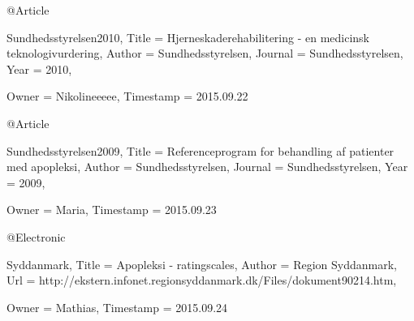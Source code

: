 @Article{Sundhedsstyrelsen2010,
  Title                    = {Hjerneskaderehabilitering - en medicinsk teknologivurdering},
  Author                   = {Sundhedsstyrelsen},
  Journal                  = {Sundhedsstyrelsen},
  Year                     = {2010},

  Owner                    = {Nikolineeeee},
  Timestamp                = {2015.09.22}
}

@Article{Sundhedsstyrelsen2009,
  Title                    = {Referenceprogram for behandling af patienter med apopleksi},
  Author                   = {Sundhedsstyrelsen},
  Journal                  = {Sundhedsstyrelsen},
  Year                     = {2009},

  Owner                    = {Maria},
  Timestamp                = {2015.09.23}
}

@Electronic{Syddanmark,
  Title                    = {Apopleksi - ratingscales},
  Author                   = {Region Syddanmark},
  Url                      = {http://ekstern.infonet.regionsyddanmark.dk/Files/dokument90214.htm},

  Owner                    = {Mathias},
  Timestamp                = {2015.09.24}
}